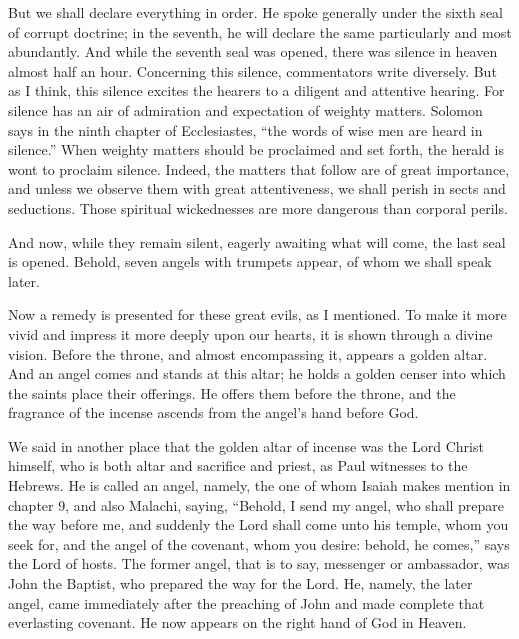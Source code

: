 But we shall declare everything in order. He spoke generally under the sixth seal of corrupt doctrine; in the seventh, he will declare the same particularly and most abundantly. And while the seventh seal was opened, there was silence in heaven almost half an hour. Concerning this silence, commentators write diversely. But as I think, this silence excites the hearers to a diligent and attentive hearing. For silence has an air of admiration and expectation of weighty matters. Solomon says in the ninth chapter of Ecclesiastes, “the words of wise men are heard in silence.” When weighty matters should be proclaimed and set forth, the herald is wont to proclaim silence. Indeed, the matters that follow are of great importance, and unless we observe them with great attentiveness, we shall perish in sects and seductions. Those spiritual wickednesses are more dangerous than corporal perils.

And now, while they remain silent, eagerly awaiting what will come, the last seal is opened. Behold, seven angels with trumpets appear, of whom we shall speak later.

Now a remedy is presented for these great evils, as I mentioned. To make it more vivid and impress it more deeply upon our hearts, it is shown through a divine vision. Before the throne, and almost encompassing it, appears a golden altar. And an angel comes and stands at this altar; he holds a golden censer into which the saints place their offerings. He offers them before the throne, and the fragrance of the incense ascends from the angel’s hand before God.

We said in another place that the golden altar of incense was the Lord Christ himself, who is both altar and sacrifice and priest, as Paul witnesses to the Hebrews. He is called an angel, namely, the one of whom Isaiah makes mention in chapter 9, and also Malachi, saying, “Behold, I send my angel, who shall prepare the way before me, and suddenly the Lord shall come unto his temple, whom you seek for, and the angel of the covenant, whom you desire: behold, he comes,” says the Lord of hosts. The former angel, that is to say, messenger or ambassador, was John the Baptist, who prepared the way for the Lord. He, namely, the later angel, came immediately after the preaching of John and made complete that everlasting covenant. He now appears on the right hand of God in Heaven.

